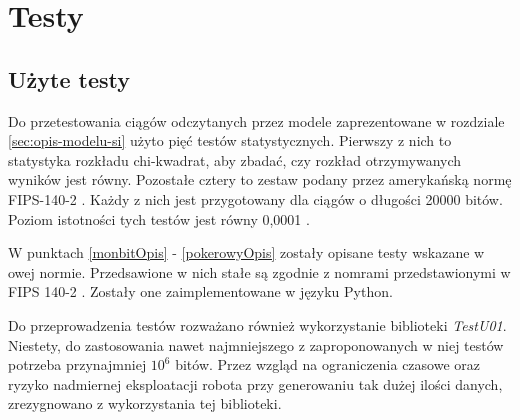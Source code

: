 \chapter{Testy}

\section{Użyte testy}
\label{testyOpis}

Do przetestowania ciągów odczytanych przez modele zaprezentowane w rozdziale \ref{sec:opis-modelu-si} użyto pięć 
testów statystycznych. Pierwszy z nich to statystyka rozkładu chi-kwadrat, aby zbadać, czy rozkład otrzymywanych 
wyników jest równy. Pozostałe cztery to zestaw podany przez amerykańską normę FIPS-140-2 \cite{NIST2001}. Każdy z nich 
jest przygotowany dla ciągów o długości 20000 bitów. Poziom istotności tych testów jest równy 0{,}0001 \cite{Kotulski2001}.


W punktach \ref{monbitOpis} - \ref{pokerowyOpis} zostały opisane testy wskazane w owej normie. Przedsawione w nich stałe
są zgodnie z nomrami przedstawionymi w FIPS 140-2 \cite{NIST2001}. Zostały one zaimplementowane w języku Python.
\par
Do przeprowadzenia testów rozważano również wykorzystanie biblioteki \textit{TestU01}. Niestety, do zastosowania nawet 
najmniejszego z zaproponowanych w niej testów potrzeba przynajmniej \begin{math} 10^6 \end{math} bitów. Przez 
wzgląd na ograniczenia czasowe oraz ryzyko nadmiernej eksploatacji robota przy generowaniu tak dużej ilości danych, 
zrezygnowano z wykorzystania tej biblioteki.


